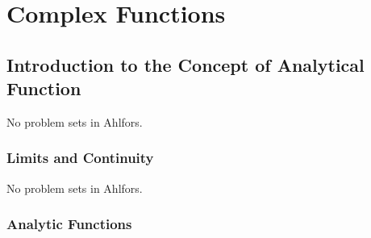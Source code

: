 \chapter{Complex Functions}

\section{Introduction to the Concept of Analytical Function}
No problem sets in Ahlfors.

\subsection{Limits and Continuity}
No problem sets in Ahlfors.

\subsection{Analytic Functions}

